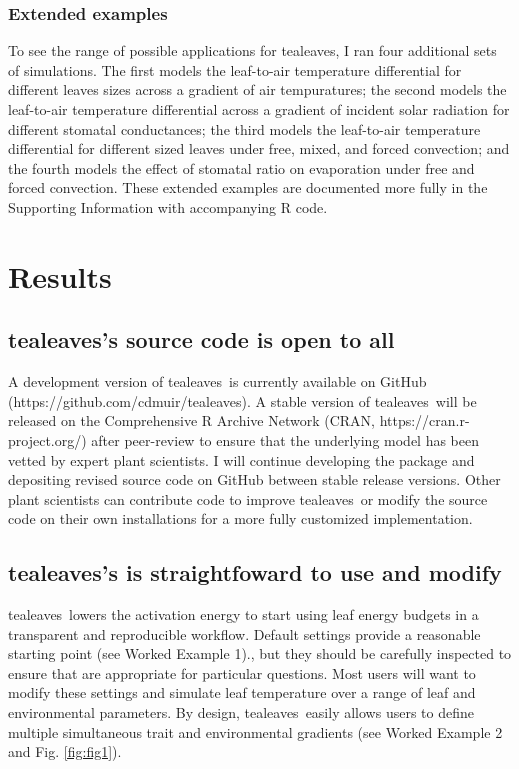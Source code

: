 \documentclass[11pt, oneside]{article}
\newcommand{\pkg}[1]{{\fontseries{b}\selectfont #1}}
\newcommand{\tealeaves}{\pkg{tealeaves}}
\begin{document}
\subsubsection*{Extended examples}

To see the range of possible applications for \tealeaves, I ran four additional sets of simulations. The first models the leaf-to-air temperature differential for different leaves sizes across a gradient of air tempuratures; the second models the leaf-to-air temperature differential across a gradient of incident solar radiation for different stomatal conductances; the third models the leaf-to-air temperature differential for different sized leaves under free, mixed, and forced convection; and the fourth models the effect of stomatal ratio on evaporation under free and forced convection. These extended examples are documented more fully in the Supporting Information with accompanying R code.

\section*{Results}

\subsection*{\tealeaves's source code is open to all}

A development version of \tealeaves~is currently available on GitHub (https://github.com/cdmuir/tealeaves). A stable version of \tealeaves~will be released on the Comprehensive R Archive Network (CRAN, https://cran.r-project.org/) after peer-review to ensure that the underlying model has been vetted by expert plant scientists. I will continue developing the package and depositing revised source code on GitHub between stable release versions. Other plant scientists can contribute code to improve \tealeaves~or modify the source code on their own installations for a more fully customized implementation. 

\subsection*{\tealeaves's is straightfoward to use and modify}

\tealeaves~lowers the activation energy to start using leaf energy budgets in a transparent and reproducible workflow. Default settings provide a reasonable starting point (see Worked Example 1)., but they should be carefully inspected to ensure that are appropriate for particular questions. Most users will want to modify these settings and simulate leaf temperature over a range of leaf and environmental parameters. By design, \tealeaves~easily allows users to define multiple simultaneous trait and environmental gradients (see Worked Example 2 and Fig. \ref{fig:fig1}).
\end{document}
